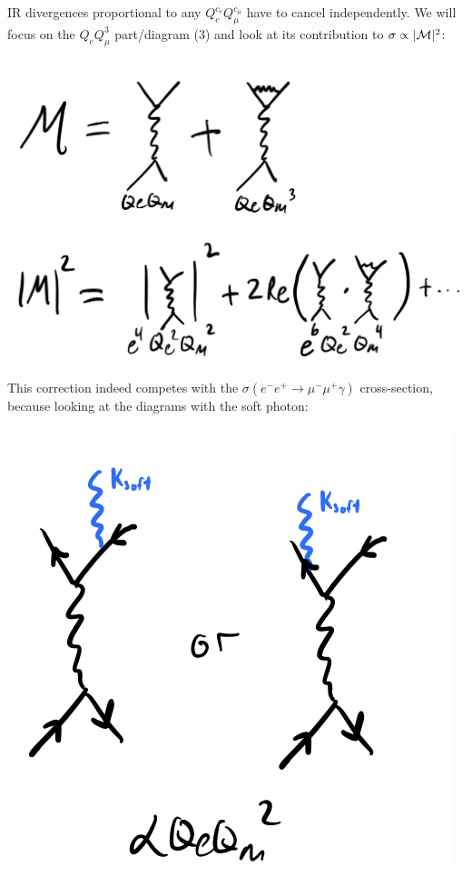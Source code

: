 IR divergences proportional to any $Q_e^{c_e}Q_{\mu}^{c_\mu}$ have to cancel independently. We will focus on the $Q_eQ_\mu^3$ part/diagram (3) and look at its contribution to $\sigma \propto \lvert \mathcal{M} \rvert^2$:

\begin{center}
    \includegraphics[scale=0.35]{Lectures/Images/lec14-oneloopcrosssection.png}
\end{center}

This correction indeed competes with the $\sigma(e^-e^+ \to \mu^-\mu^+\gamma)$ cross-section, because looking at the diagrams with the soft photon:

\begin{center}
    \includegraphics[scale=0.35]{Lectures/Images/lec14-softphotondiagrams.png}
\end{center}

